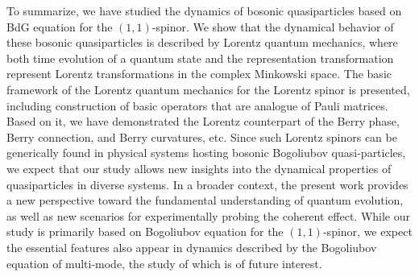 \documentclass[pra,epsfig,rotate,superscriptaddress,showpacs]{revtex4}
\begin{document}
To summarize, we have studied the dynamics of bosonic quasiparticles based on BdG equation
for the $(1,1)$-spinor. We show that the dynamical behavior of these bosonic quasiparticles is described by Lorentz quantum mechanics, where both time evolution of a quantum state and the representation transformation represent Lorentz transformations in the complex Minkowski space. The basic framework of the Lorentz quantum mechanics for the Lorentz spinor is presented, including construction of basic operators that are analogue of Pauli matrices. Based on it, we have demonstrated the Lorentz counterpart of the Berry phase, Berry connection, and Berry curvatures, etc. Since such Lorentz spinors can be generically found in physical systems hosting bosonic Bogoliubov quasi-particles, we expect that our study allows new insights into the dynamical properties of quasiparticles in diverse systems. In a broader context, the present work provides a new perspective toward the fundamental understanding of quantum evolution, as well as new scenarios for experimentally probing the coherent effect. While our study is primarily based on Bogoliubov equation for the $(1,1)$-spinor, we expect the essential features also appear in dynamics described by the Bogoliubov equation of multi-mode, the study of which is of future interest.
\end{document}
